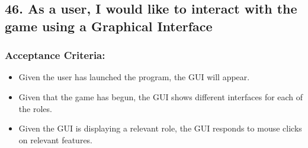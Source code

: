 \subsection*{46. As a user, I would like to interact with the game using a Graphical Interface}


\subsubsection*{Acceptance Criteria:}

\begin{itemize}
\item Given the user has launched the program, the GUI will appear.
\item Given that the game has begun, the GUI shows different interfaces for each of the roles.
\item Given the GUI is displaying a relevant role, the GUI responds to mouse clicks on relevant features.
\end{itemize}

